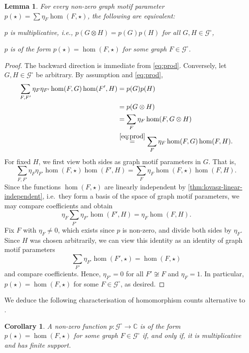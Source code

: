\documentclass[11pt]{scrartcl}
\theoremstyle{definition}
\theoremstyle{plain}
\newtheorem{lemma}[definition]{Lemma}
\newtheorem{corollary}[definition]{Corollary}
\theoremstyle{remark}
\newcommand{\lG}{\mathcal{G}^\circ}
\begin{document}
	\begin{lemma}\label{lem:gmp-multiplicative}
		For every non-zero graph motif parameter $p(\star) = \sum \eta_F \hom(F, \star)$,
		the following are equivalent:
		\begin{assertions}
			\item $p$ is \emph{multiplicative}, i.e., $p(G \otimes H) = p(G) p(H)$ for all $G, H \in \lG$,
			\item $p$ is of the form $p(\star) = \hom(F, \star)$ for some graph $F \in \lG$.
		\end{assertions}
	\end{lemma}
	\begin{proof}
		The backward direction is immediate from \cref{eq:prod}.
		Conversely, 
		let $G, H \in \lG$ be arbitrary.
		By assumption and \cref{eq:prod},
		\begin{align*}
			\sum_{F, F'} \eta_F \eta_{F'} \hom(F, G) \hom(F',H)
			&= p(G) p(H)  \\
			&= p(G \otimes H)\\
			&= \sum_F \eta_F \hom(F, G \otimes H)\\
			&\overset{\eqref{eq:prod}}{=} \sum_F \eta_F \hom(F, G) \hom(F,H).
		\end{align*}
		For fixed $H$, we first view both sides as graph motif parameters in $G$. That is,
		\[
		\sum_{F, F'} \eta_F \eta_{F'} \hom(F, \star) \hom(F',H)  =  \sum_F \eta_F \hom(F, \star) \hom(F,H).
		\]
		Since the functions $\hom(F, \star)$ are linearly independent by \cref{thm:lovasz-linear-independent}, i.e.\ they form a basis of the space of graph motif parameters, we may compare coefficients and obtain
		\[
			\eta_{F} \sum_{F'} \eta_{F'} \hom(F', H)
			= 
			\eta_F \hom(F, H).
		\]
		Fix $F$ with $\eta_F \neq 0$, which exists since $p$ is non-zero, and divide both sides by $\eta_F$.
		Since $H$ was chosen arbitrarily, we can view this identity as an identity of graph motif parameters 
		\[
			\sum_{F'} \eta_{F'} \hom(F', \star)
			= 
			\hom(F, \star)
		\]
		and compare coefficients.
		Hence, $\eta_{F'} = 0$ for all $F' \not\cong F$ and $\eta_F = 1$.
		In particular, $p(\star) = \hom(F, \star)$ for some $F \in \lG$, as desired.
	\end{proof}

	We deduce the following characterisation of homomorphism counts alternative to \textcite{lovasz_dual_2010}.

	\begin{corollary}
		\label{cor:fls-alternative}
		A non-zero function $p \colon \lG \to \mathbb{C}$ is of the form $p(\star) = \hom(F, \star)$ for some graph $F \in \lG$ if, and only if, it is multiplicative and has finite support.
	\end{corollary}
\end{document}
